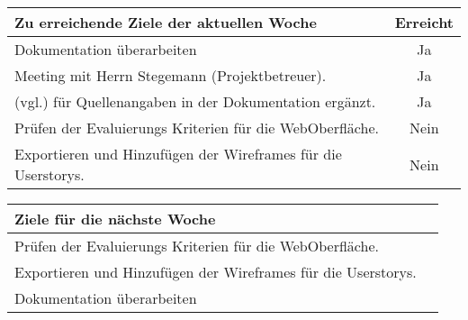 \begin{tabularx}{\textwidth}{Xc}
    \arrayrulecolor{OliveGreen}
    \toprule
    {\bfseries Zu erreichende Ziele der aktuellen Woche} & {\bfseries Erreicht} \\
    \midrule[2pt]
    Dokumentation überarbeiten                              &Ja              \\
    \rowcolor{OliveGreen!15}
    Meeting mit Herrn Stegemann (Projektbetreuer).           &Ja              \\
    \rowcolor{White}
    (vgl.) für Quellenangaben in der Dokumentation ergänzt.  &Ja              \\
    \rowcolor{OliveGreen!15}
    Prüfen der Evaluierungs Kriterien für die WebOberfläche. &Nein            \\
    \rowcolor{White}
    Exportieren und Hinzufügen der Wireframes für die Userstorys.  &Nein      \\
    \bottomrule[2pt]
\end{tabularx}
%
\vspace{1cm}
%
\begin{tabularx}{\textwidth}{Xc}
    \arrayrulecolor{OliveGreen}
    \toprule
    {\bfseries Ziele für die nächste Woche}        &                         \\
    \midrule[2pt]
    Prüfen der Evaluierungs Kriterien für die WebOberfläche.   &              \\
    \rowcolor{OliveGreen!15}
    Exportieren und Hinzufügen der Wireframes für die Userstorys.  &          \\
    \rowcolor{White}
    Dokumentation überarbeiten                                  &            \\
\end{tabularx}
